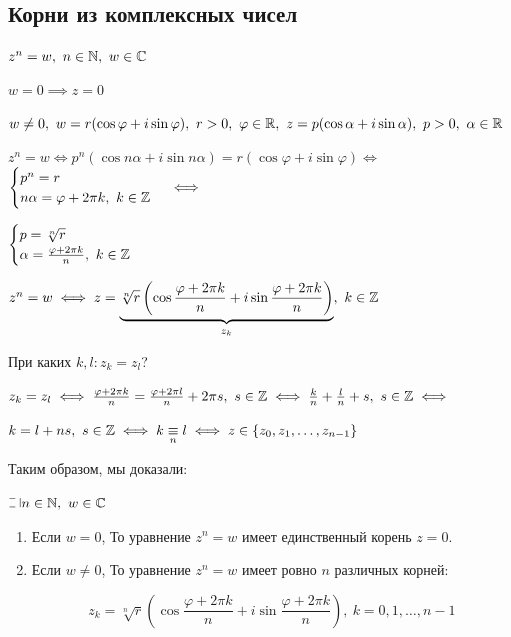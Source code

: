 \subsection{Корни из комплексных чисел}

$z^n = w,~n \in \mathbb{N},~w \in \mathbb{C}$

$w = 0 \implies z = 0$

$w \neq 0,~w = r (\cos \varphi + i \sin \varphi),~r > 0,~\varphi \in \mathbb{R},~z = p (\cos \alpha + i \sin \alpha),~p > 0,~\alpha \in \mathbb{R}$

$z^n = w \iff p^n (\cos n \alpha + i \sin n \alpha) = r (\cos \varphi + i \sin \varphi) \iff$
$\begin{cases}
    p^n = r\\
    n \alpha = \varphi + 2 \pi k,~k \in \mathbb{Z}
\end{cases} \iff$

$\begin{cases}
    p = \sqrt[n]{r}\\
    \alpha = \frac{\varphi + 2 \pi k}{n},~k \in \mathbb{Z}
\end{cases}$

$z^n = w \iff z = \underbrace{\sqrt[n]{r} \left(\cos \frac{\varphi + 2 \pi k}{n} + i \sin \frac{\varphi + 2 \pi k}{n}\right)}_{z_k},~k \in \mathbb{Z}$

При каких $k, l: z_k = z_l$?

$z_k = z_l \iff \frac{\varphi + 2 \pi k}{n} = \frac{\varphi + 2 \pi l}{n} + 2 \pi s,~s \in \mathbb{Z} \iff \frac{k}{n} + \frac{l}{n} + s,~s \in \mathbb{Z} \iff $  

$k = l + ns,~s \in \mathbb{Z} \iff k \underset{n}{\equiv} l \iff z \in \{z_0, z_1, \ldots, z_{n-1}\}$

Таким образом, мы доказали:

\begin{theorem}
    $\letus n \in \N,~w \in \CC$

    \begin{enumerate}
        \item Если $w = 0$, То уравнение $z^n = w$ имеет единственный корень $z = 0$.
        
        \item Если $w \neq 0$, То уравнение $z^n = w$ имеет ровно $n$ различных корней:
    
        \[ z_k = \sqrt[n]{r} \left(\cos \frac{\varphi + 2 \pi k}{n} + i \sin \frac{\varphi + 2 \pi k}{n}\right),~k = 0, 1, \ldots, n-1 \]

    \end{enumerate}
\end{theorem}

